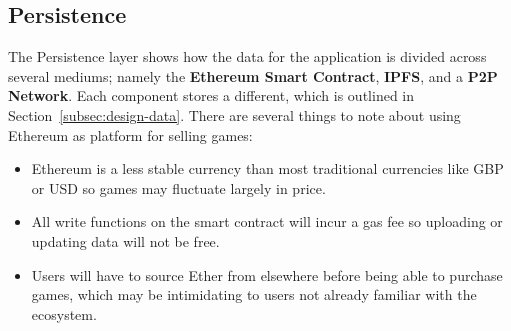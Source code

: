 
\subsection{Persistence}

The Persistence layer shows how the data for the application is divided across several mediums; namely the \textbf{Ethereum Smart Contract}, \textbf{IPFS}, and a \textbf{P2P Network}. Each component stores a different, which is outlined in Section~\ref{subsec:design-data}.
\x
There are several things to note about using Ethereum as platform for selling games:

\begin{itemize}
  \item Ethereum is a less stable currency than most traditional currencies like GBP or USD so games may fluctuate largely in price.
  \item All write functions on the smart contract will incur a gas fee so uploading or updating data will not be free.
  \item Users will have to source Ether from elsewhere before being able to purchase games, which may be intimidating to users not already familiar with the ecosystem.
\end{itemize}







